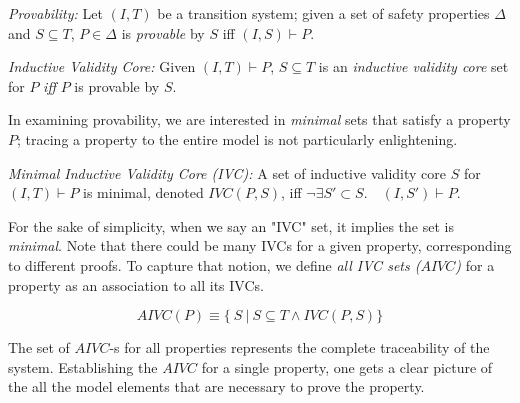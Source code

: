 \begin{definition}{\emph{Provability:}}
Let $(I, T)$ be a transition system; given a set of safety properties $\Delta$ and $S \subseteq T$, $P \in \Delta$ is \emph{provable} by $S$ iff
$(I, S) \vdash P$.
\end{definition}

\begin{definition}{\emph{Inductive Validity Core:}}
  \label{def:ivc}
  Given $(I, T)\vdash P$, $S \subseteq
  T$ is an {\em inductive validity core} set for $P$
  \emph{iff} $P$ is provable by $S$.
\end{definition}

In examining provability, we are interested in {\em minimal} sets that satisfy a property $P$; tracing a property to the entire model is not particularly enlightening.

\begin{definition}{\emph{Minimal Inductive Validity Core (IVC):}}
  \label{def:minimal-ivc}
  A set of inductive validity core $S$ for $(I, T)\vdash P$ is minimal, denoted $IVC(P, S)$, iff
  $\neg\exists S' \subset S .\quad (I, S') \vdash P $.
\end{definition}

For the sake of simplicity, when we say an "IVC" set, it implies the set is \emph{minimal}.
Note that there could be many IVCs for a given property, corresponding to different proofs. To capture that notion, we define \emph{all IVC sets ($AIVC$)} for a property as an association to all its IVCs.

$$ AIVC(P) \equiv  \{\ S~|~S \subseteq T \land  IVC(P, S)\} $$

\noindent The set of $AIVC$-s for all properties represents the complete traceability of the system. Establishing the $AIVC$ for a single property, one gets a clear picture of the all the model elements that are necessary to prove the property.

